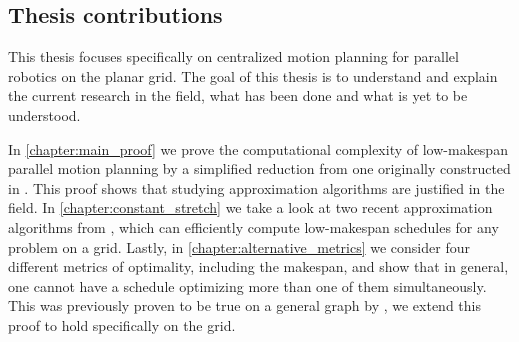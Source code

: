 \subsection{Thesis contributions}

This thesis focuses specifically on centralized motion planning for parallel robotics on the planar grid. The goal of this thesis is to understand and explain the current research in the field, what has been done and what is yet to be understood. 

In \cref{chapter:main_proof} we prove the computational complexity of low-makespan parallel motion planning by a simplified reduction from one originally constructed in \cite{siamcomp/DemaineFKMS19}. This proof shows that studying approximation algorithms are justified in the field. In \cref{chapter:constant_stretch} we take a look at two recent approximation algorithms from \cite{siamcomp/DemaineFKMS19}, which can efficiently compute low-makespan schedules for any problem on a grid. Lastly, in \cref{chapter:alternative_metrics} we consider four different metrics of optimality, including the makespan, and show that in general, one cannot have a schedule optimizing more than one of them simultaneously. This was previously proven to be true on a general graph by \cite{corr/YuL15c}, we extend this proof to hold specifically on the grid.
